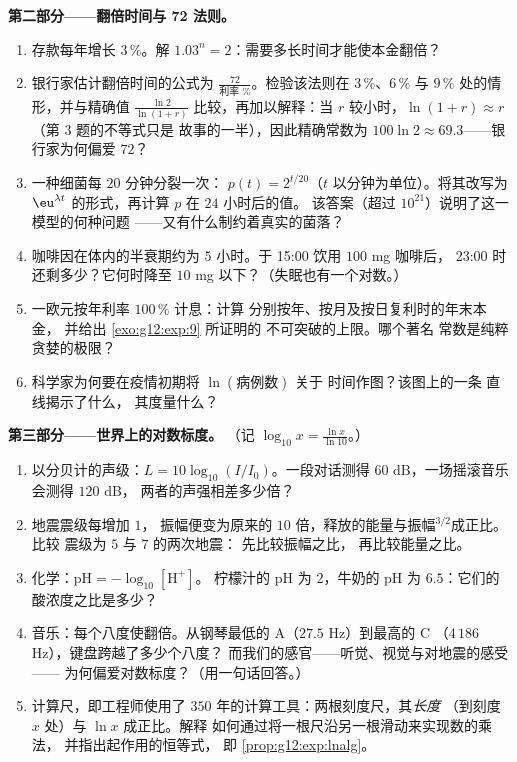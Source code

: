 \begin{problem}
\medskip
\noindent\textbf{第二部分——翻倍时间与
72 法则。}
\begin{enumerate}[resume]
  \item 存款每年增长 $3\,\%$。解
        $1.03^n = 2$：需要多长时间才能使本金翻倍？
  \item 银行家估计翻倍时间的公式为
        $\frac{72}{\text{利率 }\%}$。检验该法则在
        $3\,\%$、$6\,\%$ 与 $9\,\%$ 处的情形，并与精确值
        $\frac{\ln 2}{\ln(1 + r)}$ 比较，再加以解释：当
        $r$ 较小时，$\ln(1 + r) \approx r$（第 3 题的不等式只是
        故事的一半），因此精确常数为
        $100 \ln 2 \approx 69.3$——银行家为何偏爱
        $72$？
  \item 一种细菌每 $20$ 分钟分裂一次：
        $p(t) = 2^{t/20}$（$t$ 以分钟为单位）。将其改写为
        $\eu^{\lambda t}$ 的形式，再计算 $p$ 在 $24$ 小时后的值。
        该答案（超过 $10^{21}$）说明了这一模型的何种问题
——又有什么制约着真实的菌落？
  \item 咖啡因在体内的半衰期约为 $5$
        小时。于 15:00 饮用 $100$ mg 咖啡后，
        23:00 时还剩多少？它何时降至
        $10$ mg 以下？（失眠也有一个对数。）
  \item 一欧元按年利率 $100\,\%$ 计息：计算
        分别按年、按月及按日复利时的年末本金，
        并给出 \cref{exo:g12:exp:9} 所证明的
        不可突破的上限。哪个著名
        常数是纯粹贪婪的极限？
  \item 科学家为何要在疫情初期将 $\ln(\text{病例数})$ 关于
        时间作图？该图上的一条
        直线揭示了什么，
        其度量什么？
\end{enumerate}

\medskip
\noindent\textbf{第三部分——世界上的对数标度。}
（记 $\log_{10} x = \frac{\ln x}{\ln 10}$。）
\begin{enumerate}[resume]
  \item 以分贝计的声级：$L = 10 \log_{10}(I/I_0)$。一段对话测得
        $60$ dB，一场摇滚音乐会测得 $120$ dB，
        两者的声强相差多少倍？
  \item 地震震级每增加 $1$，
        振幅便变为原来的 $10$ 倍，释放的能量与振幅$^{3/2}$成正比。比较
        震级为 $5$ 与 $7$ 的两次地震：
        先比较振幅之比，
        再比较能量之比。
  \item 化学：$\text{pH} = -\log_{10}[\mathrm{H^+}]$。
        柠檬汁的 pH 为 $2$，牛奶的 pH 为 $6.5$：它们的
        酸浓度之比是多少？
  \item 音乐：每个八度使翻倍。从钢琴最低的
        A（$27.5$ Hz）到最高的 C
        （$4\,186$ Hz），键盘跨越了多少个八度？
        而我们的感官——听觉、视觉与对地震的感受——
        为何偏爱对数标度？（用一句话回答。）
  \item 计算尺，即工程师使用了 $350$
        年的计算工具：两根刻度尺，其\emph{长度}
        （到刻度 $x$ 处）与 $\ln x$ 成正比。解释
        如何通过将一根尺沿另一根滑动来实现数的乘法，
        并指出起作用的恒等式，
        即 \cref{prop:g12:exp:lnalg}。
\end{enumerate}


\end{problem}
